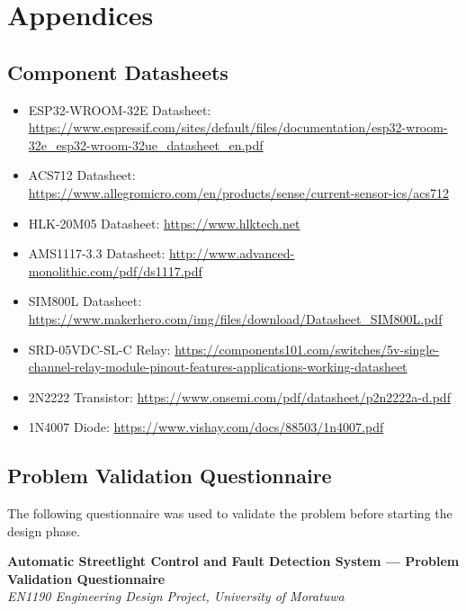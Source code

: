 \documentclass[12pt,a4paper]{article}
\begin{document}
\newpage
\appendix
\section{Appendices}

\subsection{Component Datasheets}

\begin{itemize}
    \item ESP32-WROOM-32E Datasheet: \url{https://www.espressif.com/sites/default/files/documentation/esp32-wroom-32e_esp32-wroom-32ue_datasheet_en.pdf}
    \item ACS712 Datasheet: \url{https://www.allegromicro.com/en/products/sense/current-sensor-ics/acs712}
    \item HLK-20M05 Datasheet: \url{https://www.hlktech.net}
    \item AMS1117-3.3 Datasheet: \url{http://www.advanced-monolithic.com/pdf/ds1117.pdf}
    \item SIM800L Datasheet: \url{https://www.makerhero.com/img/files/download/Datasheet_SIM800L.pdf}
    \item SRD-05VDC-SL-C Relay: \url{https://components101.com/switches/5v-single-channel-relay-module-pinout-features-applications-working-datasheet}
    \item 2N2222 Transistor: \url{https://www.onsemi.com/pdf/datasheet/p2n2222a-d.pdf}
    \item 1N4007 Diode: \url{https://www.vishay.com/docs/88503/1n4007.pdf}
\end{itemize}

\subsection{Problem Validation Questionnaire}

The following questionnaire was used to validate the problem before starting the design phase.

\bigskip
\noindent\textbf{Automatic Streetlight Control and Fault Detection System --- Problem Validation Questionnaire}\\
\textit{EN1190 Engineering Design Project, University of Moratuwa}
\end{document}

